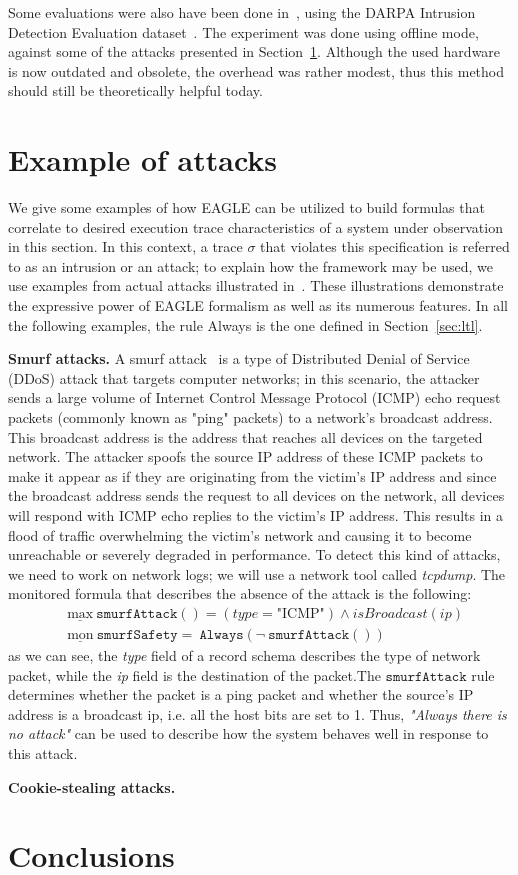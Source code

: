 \documentclass[english]{article}
\begin{document}
Some evaluations were also have been done in~\cite{naldurg2004temporal}, using the DARPA Intrusion Detection Evaluation dataset~\cite{mchugh2000testing}. The experiment was done using offline mode, against some of the attacks presented in Section~\ref{attacks}. Although the used hardware is now outdated and obsolete, the overhead was rather modest, thus this method should still be theoretically helpful today.

\section{Example of attacks}\label{attacks}
We give some examples of how EAGLE can be utilized to build formulas that correlate to desired execution trace characteristics of a system under observation in this section. In this context, a trace $\sigma$ that violates this specification is referred to as an intrusion or an attack; to explain how the framework may be used, we use examples from actual attacks illustrated in~\cite{naldurg2004temporal}. These illustrations demonstrate the expressive power of EAGLE formalism as well as its numerous features. In all the following examples, the rule Always is the one defined in Section~\ref{sec:ltl}.

\textbf{Smurf attacks.}
A smurf attack~\cite{zargar2009identification} is a type of Distributed Denial of Service (DDoS) attack that targets computer networks; in this scenario, the attacker sends a large volume of Internet Control Message Protocol (ICMP) echo request packets (commonly known as "ping" packets) to a network's broadcast address. This broadcast address is the address that reaches all devices on the targeted network. The attacker spoofs the source IP address of these ICMP packets to make it appear as if they are originating from the victim's IP address and since the broadcast address sends the request to all devices on the network, all devices will respond with ICMP echo replies to the victim's IP address. This results in a flood of traffic overwhelming the victim's network and causing it to become unreachable or severely degraded in performance. To detect this kind of attacks, we need to work on network logs; we will use a network tool called \textit{tcpdump}. The monitored formula that describes the absence of the attack is the following:
\begin{align*}
    & \underline{\text{max}}\ \mathtt{smurfAttack()} = (type = \text{"ICMP"})\land isBroadcast(ip) \\
    & \underline{\text{mon}}\ \mathtt{smurfSafety} =\ \mathtt{Always}(\neg\ \mathtt{smurfAttack()}) 
\end{align*}
as we can see, the \textit{type} field of a record schema describes the type of network packet, while the \textit{ip} field is the destination of the packet.The $\mathtt{smurfAttack}$ rule determines whether the packet is a ping packet and whether the source's IP address is a broadcast ip, i.e. all the host bits are set to 1. Thus, \textit{"Always there is no attack"} can be used to describe how the system behaves well in response to this attack.

\textbf{Cookie-stealing attacks.}

\section{Conclusions}

\printbibliography
\end{document}
